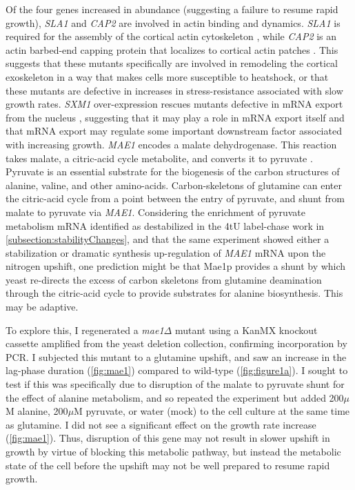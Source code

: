 Of the four genes increased in abundance (suggesting a failure to
resume rapid growth), \textit{SLA1} and
\textit{CAP2} are involved in actin binding and dynamics.
\textit{SLA1} is required for the assembly of the cortical actin
cytoskeleton \parencite{don'thaveit}, while \textit{CAP2} is an actin barbed-end
capping protein that localizes to cortical actin patches
\parencite{needtolook}. 
This suggests that these mutants specifically are involved in
remodeling the cortical exoskeleton in a way that makes cells more
susceptible to heatshock, or that these mutants are defective in
increases in stress-resistance associated with slow growth rates.
\textit{SXM1} over-expression rescues mutants defective in mRNA export 
from the nucleus \parencite{seedorf1997importin}, suggesting that it
may play a role in mRNA export itself and that mRNA export may
regulate some important downstream factor associated with increasing
growth.
\textit{MAE1} encodes a malate dehydrogenase. This reaction takes
malate, a citric-acid cycle metabolite, and converts it to pyruvate
\parencite{boles1998identification}.
Pyruvate is an essential substrate for the
biogenesis of the carbon structures of alanine, valine, and other 
amino-acids.
Carbon-skeletons of glutamine can enter the citric-acid cycle from a
point between the entry of pyruvate, and shunt from malate to pyruvate
via \textit{MAE1}.
Considering the enrichment of pyruvate metabolism mRNA identified as 
destabilized in the 4tU label-chase work in 
\autoref{subsection:stabilityChanges}, and that the same experiment 
showed either a stabilization or dramatic synthesis up-regulation of 
\textit{MAE1} mRNA upon the nitrogen upshift, one prediction might 
be that Mae1p provides a shunt by which yeast re-directs the excess of
carbon skeletons from glutamine deamination through the citric-acid
cycle to provide substrates for alanine biosynthesis. This may be
adaptive.

To explore this, I regenerated a \textit{mae1}$\Delta$ mutant using
a KanMX knockout cassette amplified from the yeast deletion
collection, confirming incorporation by PCR. I subjected this mutant
to a glutamine upshift, and saw an increase in the lag-phase duration
(\autoref{fig:mae1})
compared to wild-type (\autoref{fig:figure1a}). I sought to test if this
was specifically due to disruption of the malate to pyruvate shunt for
the effect of alanine metabolism, and so repeated the experiment but
added 200$\mu$M alanine, 200$\mu$M pyruvate, or water (mock) to the 
cell culture at the same time as glutamine.
I did not see a significant effect on the growth rate increase
(\autoref{fig:mae1}).
Thus, disruption of this gene may not result in slower upshift in
growth by virtue of blocking this metabolic pathway, but instead the
metabolic state of the cell before the upshift may not be well 
prepared to resume rapid growth.


